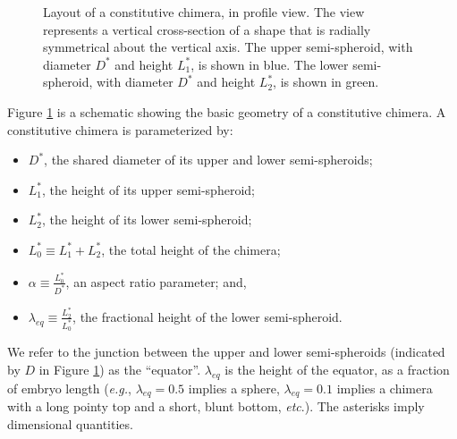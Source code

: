 \documentclass[10pt,a4paper]{article}
\def\etc{\emph{etc}.\xspace}
\begin{document}
\begin{figure}[t] 
	\begin{center}
	\end{center}
	\caption{Layout of a constitutive chimera, in profile view. The view represents a vertical cross-section of a shape that is radially symmetrical about the vertical axis. The upper semi-spheroid, with diameter $D^*$ and height $L_1^*$, is shown in blue. The lower semi-spheroid, with diameter $D^*$ and height $L^*_2$, is shown in green. } \label{fig:chimera1}
\end{figure}
\noindent
Figure \ref{fig:chimera1} is a schematic showing the basic geometry of a constitutive chimera.
A constitutive chimera is parameterized by:
\begin{itemize}
	\item $D^*$, the shared diameter of its upper and lower semi-spheroids;
	\item $L_1^*$, the height of its upper semi-spheroid;
	\item $L_2^*$, the height of its  lower semi-spheroid; 
	\item $L_0^* \equiv L_1^* + L_2^*$, the total height of the chimera;
	\item $\alpha \equiv \frac{L_0^*}{D^*}$, an aspect ratio parameter; and,
	\item $\lambda_{eq} \equiv \frac{L_2^*}{L_0^*}$, the fractional height of the lower semi-spheroid.
\end{itemize}
We refer to the junction between the upper and lower semi-spheroids (indicated by $D$ in Figure \ref{fig:chimera1}) as the ``equator''.
$\lambda_{eq}$ is the height of the equator, as a fraction of embryo length (\textit{e.g.}, $\lambda_{eq} = 0.5$ implies a sphere, $\lambda_{eq} = 0.1$ implies a chimera with a long pointy top and a short, blunt bottom, \etc).
The asterisks imply dimensional quantities.
\end{document}
